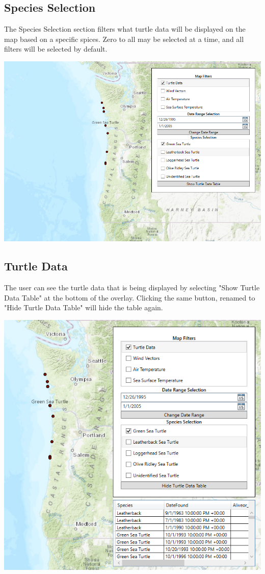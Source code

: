 \documentclass[onecolumn, draftclsnofoot,10pt, compsoc]{IEEEtran}
\begin{document}
\subsection{Species Selection}
The Species Selection section filters what turtle data will be displayed on the map based on a specific spices. Zero to all may be selected at a time, and all filters will be selected by default. 
\newline \begin{center}\includegraphics[width=0.5 \textwidth]{images/turtle-data-filter.PNG}\end{center}


\subsection{Turtle Data}
The user can see the turtle data that is being displayed by selecting "Show Turtle Data Table" at the bottom of the overlay. Clicking the same button, renamed to "Hide Turtle Data Table" will hide the table again. 
\newline \begin{center}\includegraphics[width=0.5 \textwidth]{images/data-table.PNG}\end{center}

\pagebreak
\end{document}
